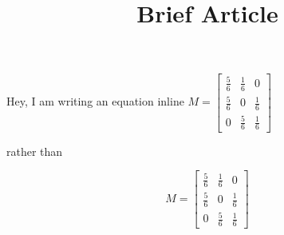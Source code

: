 \documentclass[11pt, oneside]{article}
\title{Brief Article}
\begin{document}
\maketitle

Hey, I am writing an equation inline \(M = \begin{bmatrix}
       \frac{5}{6} & \frac{1}{6} & 0           \\[0.3em]
       \frac{5}{6} & 0           & \frac{1}{6} \\[0.3em]
       0           & \frac{5}{6} & \frac{1}{6}
     \end{bmatrix} \)

rather than

\[
M = \begin{bmatrix}
       \frac{5}{6} & \frac{1}{6} & 0           \\[0.3em]
       \frac{5}{6} & 0           & \frac{1}{6} \\[0.3em]
       0           & \frac{5}{6} & \frac{1}{6}
     \end{bmatrix}
\]
\end{document}
